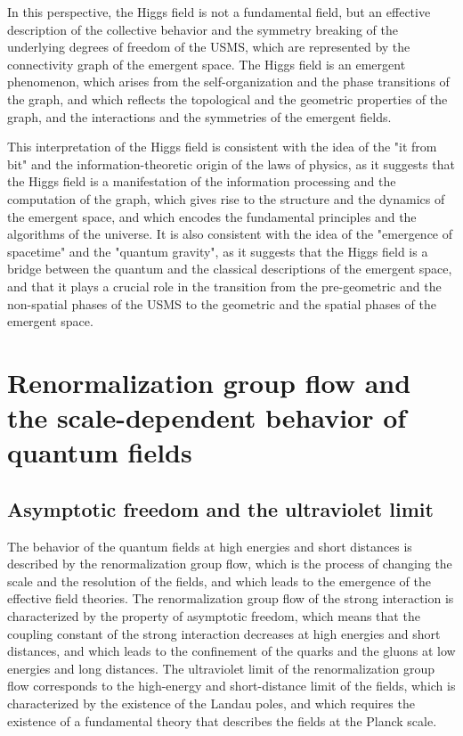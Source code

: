 \begin{tcolorbox}[colback=green!5!white,colframe=green!75!black,title=Question]
In this perspective, the Higgs field is not a fundamental field, but an effective description of the collective behavior and the symmetry breaking of the underlying degrees of freedom of the USMS, which are represented by the connectivity graph of the emergent space. The Higgs field is an emergent phenomenon, which arises from the self-organization and the phase transitions of the graph, and which reflects the topological and the geometric properties of the graph, and the interactions and the symmetries of the emergent fields.

This interpretation of the Higgs field is consistent with the idea of the "it from bit" and the information-theoretic origin of the laws of physics, as it suggests that the Higgs field is a manifestation of the information processing and the computation of the graph, which gives rise to the structure and the dynamics of the emergent space, and which encodes the fundamental principles and the algorithms of the universe. It is also consistent with the idea of the "emergence of spacetime" and the "quantum gravity", as it suggests that the Higgs field is a bridge between the quantum and the classical descriptions of the emergent space, and that it plays a crucial role in the transition from the pre-geometric and the non-spatial phases of the USMS to the geometric and the spatial phases of the emergent space.
\end{tcolorbox}

\section{Renormalization group flow and the scale-dependent behavior of quantum fields}
\subsection{Asymptotic freedom and the ultraviolet limit}
The behavior of the quantum fields at high energies and short distances is described by the renormalization group flow, which is the process of changing the scale and the resolution of the fields, and which leads to the emergence of the effective field theories. The renormalization group flow of the strong interaction is characterized by the property of asymptotic freedom, which means that the coupling constant of the strong interaction decreases at high energies and short distances, and which leads to the confinement of the quarks and the gluons at low energies and long distances. The ultraviolet limit of the renormalization group flow corresponds to the high-energy and short-distance limit of the fields, which is characterized by the existence of the Landau poles, and which requires the existence of a fundamental theory that describes the fields at the Planck scale.

